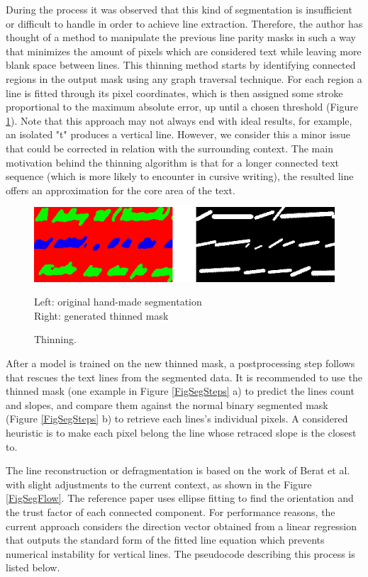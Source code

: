 During the process it was observed that this kind of segmentation is insufficient or difficult to handle in order to achieve line extraction. Therefore, the author has thought of a method to manipulate the previous line parity masks in such a way that minimizes the amount of pixels which are considered text while leaving more blank space between lines. This thinning method starts by identifying connected regions in the output mask using any graph traversal technique. For each region a line is fitted through its pixel coordinates, which is then assigned some stroke proportional to the maximum absolute error, up until a chosen threshold (Figure \ref{FigSegThinning}). Note that this approach may not always end with ideal results, for example, an isolated "t" produces a vertical line. However, we consider this a minor issue that could be corrected in relation with the surrounding context. The main motivation behind the thinning algorithm is that for a longer connected text sequence (which is more likely to encounter in cursive writing), the resulted line offers an approximation for the core area of the text.

\begin{figure}[htbp]
    \centering
        \includegraphics[scale=0.7]{figures/seg_thinning}
    \caption{Thinning.}
    \medskip
    \small
    Left: original hand-made segmentation \\ Right: generated thinned mask    
    \label{FigSegThinning}        
\end{figure}

After a model is trained on the new thinned mask, a postprocessing step follows that rescues the text lines from the segmented data. It is recommended to use the thinned mask (one example in Figure \ref{FigSegSteps} a) to predict the lines count and slopes, and compare them against the normal binary segmented mask (Figure \ref{FigSegSteps} b) to retrieve each lines's individual pixels. A considered heuristic is to make each pixel belong the line whose retraced slope is the closest to.


The line reconstruction or defragmentation is based on the work of Berat et al. \cite{segmChallenging} with slight adjustments to the current context, as shown in the Figure \ref{FigSegFlow}. The reference paper uses ellipse fitting to find the orientation and the trust factor of each connected component. For performance reasons, the current approach considers the direction vector obtained from a linear regression that outputs the standard form of the fitted line equation which prevents numerical instability for vertical lines. The pseudocode describing this process is listed below.


